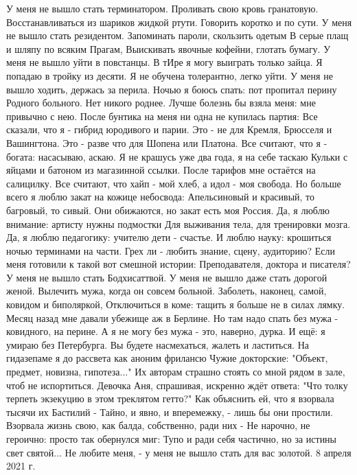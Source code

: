 У меня не вышло стать терминатором.
Проливать свою кровь гранатовую.
Восстанавливаться из шариков жидкой ртути.
Говорить коротко и по сути.
У меня не вышло стать резидентом.
Запоминать пароли, скользить одетым
В серые плащ и шляпу по всяким Прагам,
Выискивать явочные кофейни, глотать бумагу.
У меня не вышло уйти в повстанцы.
В тИре я могу выиграть только зайца.
Я попадаю в тройку из десяти.
Я не обучена толерантно, легко уйти.
У меня не вышло ходить, держась за перила.
Ночью я боюсь спать: пот пропитал перину
Родного больного. Нет никого роднее.
Лучше болезнь бы взяла меня: мне привычно с нею.
После бунтика на меня ни одна не купилась партия:
Все сказали, что я - гибрид юродивого и парии.
Это - не для Кремля, Брюсселя и Вашингтона.
Это - разве что для Шопена или Платона.
Все считают, что я - богата: насасываю, аскаю.
Я не крашусь уже два года, я на себе таскаю
Кульки с яйцами и батоном из магазинной ссылки.
После тарифов мне остаётся на салицилку.
Все считают, что хайп - мой хлеб, а идол - моя свобода.
Но больше всего я люблю закат на кожице небосвода:
Апельсиновый и красивый, то багровый, то сивый.
Они обижаются, но закат есть моя Россия.
Да, я люблю внимание: артисту нужны подмостки
Для выживания тела, для тренировки мозга.
Да, я люблю педагогику: учителю дети - счастье.
И люблю науку: крошиться ночью терминами на части.
Грех ли - любить знание, сцену, аудиторию?
Если меня готовили к такой вот смешной истории:
Преподавателя, доктора и писателя?
У меня не вышло стать Бодхисаттвой.
У меня не вышло даже стать дорогой женой.
Вылечить мужа, когда он совсем больной.
Заболеть, наконец, самой, ковидом и биполяркой,
Отключиться в коме: тащить я больше не в силах лямку.
Месяц назад мне давали убежище аж в Берлине.
Но там надо спать без мужа - ковидного, на перине.
А я не могу без мужа - это, наверно, дурка.
И ещё: я умираю без Петербурга.
Вы будете насмехаться, жалеть и ластиться.
На гидазепаме я до рассвета как аноним фрилансю
Чужие докторские: "Объект, предмет, новизна, гипотеза..."
Их авторам страшно стоять со мной рядом в зале, чтоб не испортиться.
Девочка Аня, спрашивая, искренно ждёт ответа:
"Что толку терпеть экзекуцию в этом треклятом гетто?"
Как объяснить ей, что я взорвала тысячи их Бастилий -
Тайно, и явно, и вперемежку, - лишь бы они простили.
Взорвала жизнь свою, как балда, собственно, ради них -
Не нарочно, не героично: просто так обернулся миг:
Тупо и ради себя частично, но за истины свет святой...
Не любите меня, - у меня не вышло стать для вас золотой.
8 апреля 2021 г.

